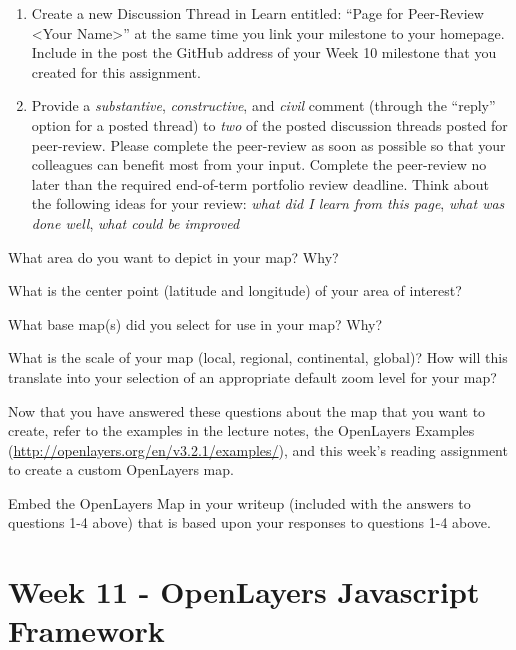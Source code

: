 \documentclass[]{book}
\providecommand{\tightlist}{%
  \setlength{\itemsep}{0pt}\setlength{\parskip}{0pt}}
\begin{document}
\begin{enumerate}
\def\labelenumi{\arabic{enumi}.}
\item
  Create a new Discussion Thread in Learn entitled: ``Page for
  Peer-Review \textless{}Your Name\textgreater{}'' at the same time you
  link your milestone to your homepage. Include in the post the GitHub
  address of your Week 10 milestone that you created for this
  assignment.
\item
  Provide a \emph{substantive}, \emph{constructive}, and \emph{civil}
  comment (through the ``reply'' option for a posted thread) to
  \emph{two} of the posted discussion threads posted for peer-review.
  Please complete the peer-review as soon as possible so that your
  colleagues can benefit most from your input. Complete the peer-review
  no later than the required end-of-term portfolio review deadline.
  Think about the following ideas for your review: \emph{what did I
  learn from this page}, \emph{what was done well}, \emph{what could be
  improved}
\end{enumerate}

\begin{description}
\tightlist
\item[Question 1]
What area do you want to depict in your map? Why?
\item[Question 2]
What is the center point (latitude and longitude) of your area of
interest?
\item[Question 3]
What base map(s) did you select for use in your map? Why?
\item[Question 4]
What is the scale of your map (local, regional, continental, global)?
How will this translate into your selection of an appropriate default
zoom level for your map?
\end{description}

Now that you have answered these questions about the map that you want
to create, refer to the examples in the lecture notes, the OpenLayers
Examples (\url{http://openlayers.org/en/v3.2.1/examples/}), and this
week's reading assignment to create a custom OpenLayers map.

\begin{description}
\tightlist
\item[Question 5]
Embed the OpenLayers Map in your writeup (included with the answers to
questions 1-4 above) that is based upon your responses to questions 1-4
above.
\end{description}

\chapter{Week 11 - OpenLayers Javascript Framework}\label{week11}
\end{document}
